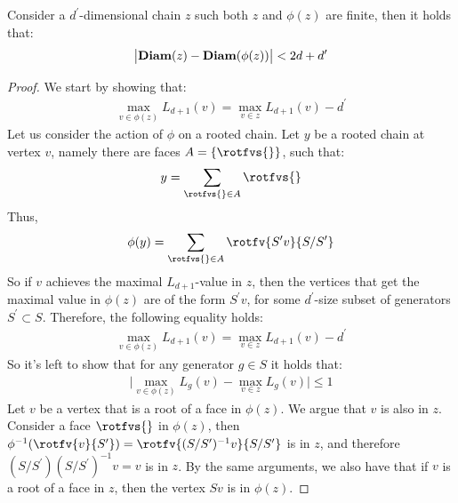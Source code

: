 \begin{claim}
  \label{claim:diamexp}
  Consider a $d^{\prime}$-dimensional chain $z$ such both $z$ and $\phi(z)$ are finite, then it holds that: 
      \begin{equation*}
        \begin{split}
          \bigl| \textbf{Diam}( z  ) - \textbf{Diam}( \phi(z)  ) \bigr| < 2d + d^{\prime}
        \end{split}
      \end{equation*}
\end{claim}
\begin{proof}
  We start by showing that: 
\begin{equation*}
  \begin{split}
    \max_{v \in \phi(z)}L_{d+1}(v) = \max_{v \in z }L_{d+1}(v) - d^{\prime}
  \end{split}
\end{equation*}
Let us consider the action of $\phi$ on a rooted chain. Let $y$ be a rooted chain at vertex $v$, namely there are faces $A = \{ \rotfvs{} \}$, such that:
\begin{equation*}
  \begin{split}
    y = \sum_{ \rotfvs{} \in A}\rotfvs{}
  \end{split}
\end{equation*}
Thus, 
\begin{equation*}
  \begin{split}
    \phi(y) = \sum_{ \rotfvs{} \in A}\rotfv{S^{\prime}v}{S/S^{\prime}}
  \end{split}
\end{equation*}
So if $v$ achieves the maximal $L_{d+1}$-value in $z$, then the vertices that get the maximal value in $\phi(z)$ are of the form $S^{\prime}v$, for some $d^{\prime}$-size subset of generators $S^{\prime} \subset S$. Therefore, the following equality holds:
\begin{equation*}
  \begin{split}
    \max_{v \in \phi(z)}L_{d+1}(v) = \max_{v \in z }L_{d+1}(v) - d^{\prime}
  \end{split}
\end{equation*}
So it's left to show that for any generator $g \in S$ it holds that: 
\begin{equation*}
  \begin{split}
     \bigl| \max_{v \in \phi(z)}L_{g}(v) -  \max_{v \in z }L_{g}(v) \bigr| \le 1
  \end{split}
\end{equation*}
Let $v$ be a vertex that is a root of a face in $\phi(z)$. We argue that $v$ is also in $z$. Consider a face $\rotfvs{}$ in $\phi(z)$, then $\phi^{-1}(\rotfv{v}{S^{\prime}}) = \rotfv{(S/S^{\prime})^{-1} v}{S/S^{\prime}}$ is in $z$, and therefore $(S/S^{\prime})(S/S^{\prime})^{-1} v = v$ is in $z$. By the same arguments, we also have that if $v$ is a root of a face in $z$, then the vertex $S v$ is in $\phi(z)$.



\end{proof}
